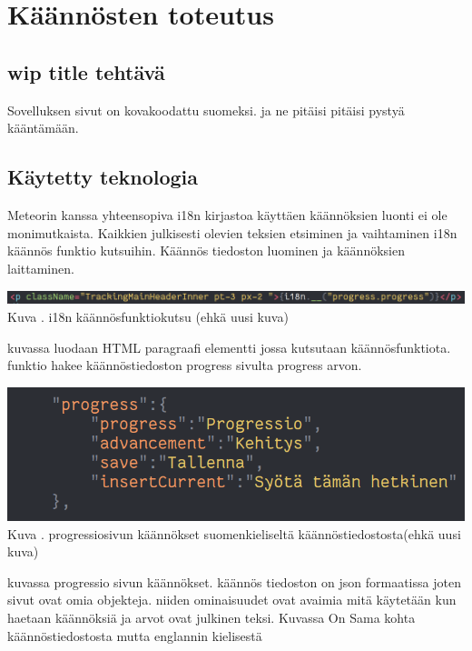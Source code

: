 \documentclass[11pt,a4paper,titlepage,oneside]{article}
\begin{document}
\newpage

\section{Käännösten toteutus}

\subsection{wip title tehtävä}
Sovelluksen sivut on kovakoodattu suomeksi. ja ne pitäisi pitäisi pystyä kääntämään.
\medskip


\subsection{Käytetty teknologia}
Meteorin kanssa yhteensopiva i18n kirjastoa käyttäen käännöksien luonti ei ole monimutkaista.
Kaikkien julkisesti olevien teksien etsiminen ja vaihtaminen i18n käännös funktio kutsuihin.
Käännös tiedoston luominen ja käännöksien laittaminen.
\medskip
\bigskip


\includegraphics[width = 15cm]{src/public/oppar/translationcall.png}\\
Kuva \getImgCount. {} i18n käännösfunktiokutsu (ehkä uusi kuva)
\medskip

kuvassa luodaan HTML paragraafi elementti jossa kutsutaan käännösfunktiota. funktio hakee käännöstiedoston progress sivulta progress arvon.
\bigskip


\includegraphics[width = 15cm]{src/public/oppar/translationfile.png}\\
Kuva \getImgCount. {} progressiosivun käännökset suomenkieliseltä käännöstiedostosta(ehkä uusi kuva)
\medskip

kuvassa progressio sivun käännökset. käännös tiedoston on json formaatissa joten sivut ovat omia objekteja. 
niiden ominaisuudet ovat avaimia mitä käytetään kun haetaan käännöksiä ja arvot ovat julkinen teksi.
Kuvassa \nextImageCount {} On Sama kohta käännöstiedostosta mutta englannin kielisestä
\medskip
\bigskip
\end{document}
